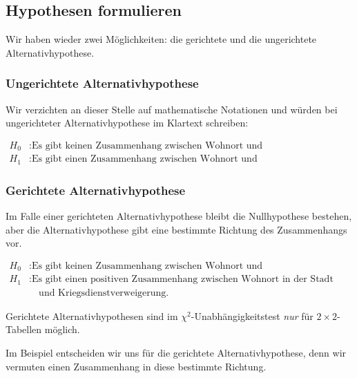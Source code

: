 \documentclass[
  11pt,
  ngerman,
  a4paper,
]{report}
\begin{document}
\hypertarget{hypothesen-formulieren-4}{%
\subsection{Hypothesen formulieren}\label{hypothesen-formulieren-4}}

Wir haben wieder zwei Möglichkeiten: die gerichtete und die ungerichtete Alternativhypothese.

\hypertarget{ungerichtete-alternativhypothese-2}{%
\subsubsection{Ungerichtete Alternativhypothese}\label{ungerichtete-alternativhypothese-2}}

Wir verzichten an dieser Stelle auf mathematische Notationen und würden bei ungerichteter Alternativhypothese im Klartext schreiben:

\[
\begin{aligned}
H_0 &: \textrm{Es gibt keinen Zusammenhang zwischen Wohnort und Verweigerungsentscheidung.}\\
H_1 &: \textrm{Es gibt einen Zusammenhang zwischen Wohnort und Verweigerungsentscheidung.}
\end{aligned}
\]

\hypertarget{gerichtete-alternativhypothese-2}{%
\subsubsection{Gerichtete Alternativhypothese}\label{gerichtete-alternativhypothese-2}}

Im Falle einer gerichteten Alternativhypothese bleibt die Nullhypothese bestehen, aber die Alternativhypothese gibt eine bestimmte Richtung des Zusammenhangs vor.

\[
\begin{aligned}
H_0 &: \textrm{Es gibt keinen Zusammenhang zwischen Wohnort und Verweigerungsentscheidung.}\\
H_1 &: \textrm{Es gibt einen positiven Zusammenhang zwischen Wohnort in der Stadt} \\
&\quad\textrm{und Kriegsdienstverweigerung.}
\end{aligned}
\]

Gerichtete Alternativhypothesen sind im \(\chi^2\)-Unabhängigkeitstest \emph{nur} für \(2\times2\)-Tabellen möglich.

Im Beispiel entscheiden wir uns für die gerichtete Alternativhypothese, denn wir vermuten einen Zusammenhang in diese bestimmte Richtung.
\end{document}
